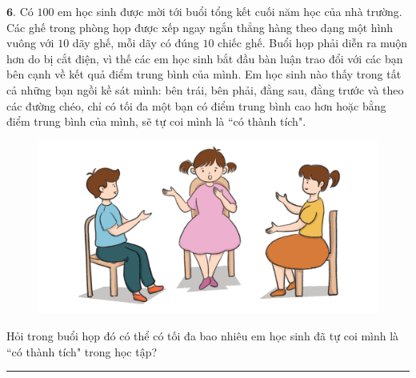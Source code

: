 \begin{multicols}{2}
	\vskip 0.1cm
	$\pmb{6.}$ 	Có $100$ em học sinh được mời tới buổi tổng kết cuối năm học của nhà trường. Các ghế trong phòng họp được xếp ngay ngắn thẳng hàng theo dạng một hình vuông với $10$ dãy ghế, mỗi dãy có đúng $10$ chiếc ghế. Buổi họp phải diễn ra muộn hơn do bị cắt điện, vì thế các em học sinh bắt đầu bàn luận trao đổi với các bạn bên cạnh về kết quả điểm trung bình của mình. Em học sinh nào thấy trong tất cả những bạn ngồi kề sát mình: bên trái, bên phải, đằng sau, đằng trước và theo các đường chéo, chỉ có tối đa một bạn có điểm trung bình cao hơn hoặc bằng điểm trung bình của  mình, sẽ tự coi mình là ``có thành tích".
	\begin{figure}[H]
		\centering
		\vspace*{-10pt}
		\captionsetup{labelformat= empty, justification=centering}
		\includegraphics[width=0.85\linewidth]{Hinh6}
		\vspace*{-10pt}
	\end{figure}
	Hỏi trong buổi họp đó có thể có tối đa bao nhiêu em học sinh đã tự coi mình là ``có thành tích" trong học tập?
\end{multicols}
\vspace*{-10pt}
{\color{toancuabi}\rule{1\linewidth}{0.1pt}}
\begingroup
